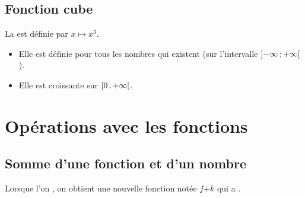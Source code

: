 \documentclass[12pt,a4paper]{article}
\begin{document}

\subsection{Fonction cube}


\begin{mydef}
	La  est définie par $x \mapsto x^3$.			
\end{mydef}

\begin{myprops}
	\begin{itemize}
		\item Elle est définie pour tous les nombres qui existent (sur l'intervalle $\mbox{\ensuremath{\left]- \infty \mathpunct{};+ \infty\right[}}$).
		\item Elle est croissante sur $\mbox{\ensuremath{\left[0\mathpunct{};+ \infty\right[}}$. 
	\end{itemize}
\end{myprops}



\section{Opérations avec les fonctions}

\subsection{Somme d'une fonction et d'un nombre}

\begin{myprop}
	Lorsque l'on , on obtient une nouvelle fonction notée $f$+$k$ qui a .
\end{myprop}
\end{document}
